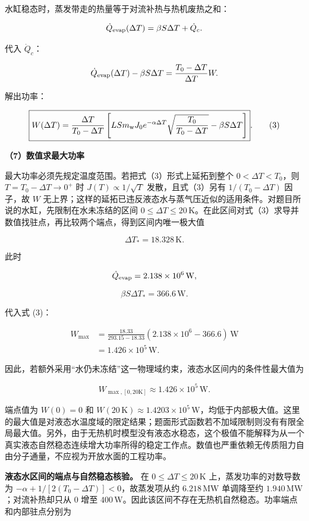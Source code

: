 \documentclass[12pt,a4paper,UTF8]{ctexart}
\begin{document}
水缸稳态时，蒸发带走的热量等于对流补热与热机废热之和：

\[
\dot Q_{\rm evap}(\Delta T)
=\beta S\Delta T+\dot Q_c.
\]

代入 \(\dot Q_c\)：

\[
\dot Q_{\rm evap}(\Delta T)-\beta S\Delta T
=\frac{T_0-\Delta T}{\Delta T}W.
\]

解出功率：

\[
\boxed{
W(\Delta T)
=\frac{\Delta T}{T_0-\Delta T}
\left[
LSm_{\rm w}J_0e^{-\alpha\Delta T}
\sqrt{\frac{T_0}{T_0-\Delta T}}
-\beta S\Delta T
\right]
}. \tag{3}
\]

\textbf{（7）数值求最大功率}

最大功率必须先规定温度范围。若把式（3）形式上延拓到整个
\(0<\Delta T<T_0\)，则 \(T=T_0-\Delta T\to0^+\) 时
\(J(T)\propto1/\sqrt T\) 发散，且式（3）另有 \(1/(T_0-\Delta T)\)
因子，故 \(W\)
无上界；这样的延拓已违反液态水与蒸气压近似的适用条件。对题目所说的水缸，先限制在水未冻结的区间
\(0\leq\Delta T\leq20\,\mathrm K\)。在此区间对式（3）求导并数值找驻点，再比较两个端点，得到区间内唯一极大值

\[
\Delta T_*=18.328\,\mathrm K.
\]

此时

\[
\dot Q_{\rm evap}=2.138\times10^6\,\mathrm W,
\]

\[
\beta S\Delta T_*=366.6\,\mathrm W.
\]

代入式 (3)：

\[
\begin{aligned}
W_{\max}
&=\frac{18.33}{293.15-18.33}
\left(2.138\times10^6-366.6\right)\,\mathrm W\\
&=1.426\times10^5\,\mathrm W.
\end{aligned}
\]

因此，若额外采用``水仍未冻结''这一物理域约束，液态水区间内的条件性最大值为

\[
\boxed{W_{\max,[0,20\mathrm K]}\approx1.426\times10^5\,\mathrm W}.
\]

端点值为 \(W(0)=0\) 和
\(W(20\,\mathrm K)\approx1.4203\times10^5\,\mathrm W\)，均低于内部极大值。这里的最大值是对液态水温度域的限定结果；题面形式函数若不加域限制则没有有限全局最大值。另外，由于无热机时模型没有液态水稳态，这个极值不能解释为从一个真实液态自然稳态连续增大功率所得的稳定工作点。数值也严重依赖无传质阻力自由分子通量，不应视为开放水面的工程功率。

\textbf{液态水区间的端点与自然稳态核验。} 在
\(0\leq\Delta T\leq20\,\mathrm K\) 上，蒸发功率的对数导数为
\(-\alpha+1/[2(T_0-\Delta T)]<0\)，故蒸发项从约 \(6.218\,\mathrm{MW}\)
单调降至约 \(1.940\,\mathrm{MW}\)；对流补热却只从 \(0\) 增至
\(400\,\mathrm W\)。因此该区间不存在无热机自然稳态。功率端点和内部驻点分别为
\end{document}
